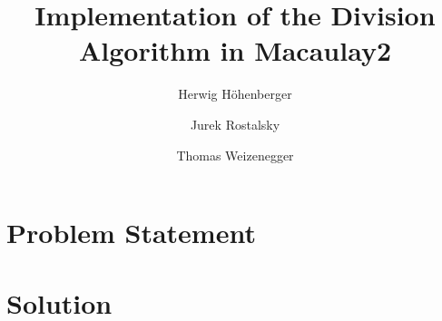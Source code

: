 \documentclass[a4paper,article,math]{turtwig}
\title{Implementation of the Division Algorithm in Macaulay2}
\author{Herwig Höhenberger \and Jurek Rostalsky \and Thomas Weizenegger}
\begin{document}
\maketitle
\tableofcontents
\section{Problem Statement}
\section{Solution}
\printbibliography%
\end{document}
